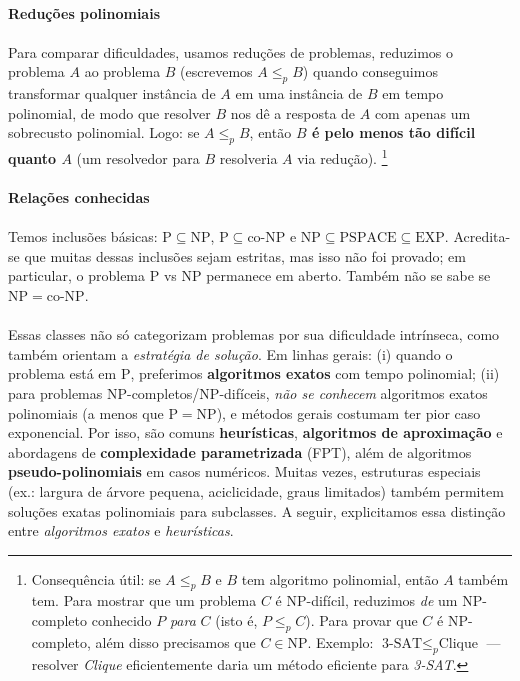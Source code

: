 \documentclass[12pt,a4paper]{article}
\begin{document}
\paragraph{Reduções polinomiais}

\paragraph{}
Para comparar dificuldades, usamos reduções de problemas, reduzimos o problema \(A\) ao problema \(B\) (escrevemos \(A\le_p B\)) quando conseguimos transformar qualquer instância de \(A\) em uma instância de \(B\) em tempo polinomial, de modo que resolver \(B\) nos dê a resposta de \(A\) com apenas um sobrecusto polinomial. Logo: se \(A\le_p B\), então \textbf{\(B\) é pelo menos tão difícil quanto \(A\)} (um resolvedor para \(B\) resolveria \(A\) via redução). \footnote{Consequência útil: se \(A\le_p B\) e \(B\) tem algoritmo polinomial, então \(A\) também tem. Para mostrar que um problema \(C\) é NP-difícil, reduzimos \emph{de} um NP-completo conhecido \(P\) \emph{para} \(C\) (isto é, \(P\le_p C\)). Para provar que \(C\) é NP-completo, além disso precisamos que \(C\in\mathrm{NP}\). Exemplo: \(\text{3-SAT}\le_p \text{Clique}\) — resolver \textit{Clique} eficientemente daria um método eficiente para \textit{3-SAT}.}

\paragraph{Relações conhecidas}

\paragraph{}
Temos inclusões básicas: \(\mathrm{P}\subseteq \mathrm{NP}\), \(\mathrm{P}\subseteq \mathrm{co\text{-}NP}\) e \(\mathrm{NP}\subseteq \mathrm{PSPACE}\subseteq \mathrm{EXP}\). Acredita-se que muitas dessas inclusões sejam estritas, mas isso não foi provado; em particular, o problema \(\mathrm{P}\) vs \(\mathrm{NP}\) permanece em aberto. Também não se sabe se \(\mathrm{NP}=\mathrm{co\text{-}NP}\).

\paragraph{}
Essas classes não só categorizam problemas por sua dificuldade intrínseca, como também orientam a \emph{estratégia de solução}. Em linhas gerais: (i) quando o problema está em \(\mathrm{P}\), preferimos \textbf{algoritmos exatos} com tempo polinomial; (ii) para problemas NP-completos/NP-difíceis, \emph{não se conhecem} algoritmos exatos polinomiais (a menos que \(\mathrm{P}=\mathrm{NP}\)), e métodos gerais costumam ter pior caso exponencial. Por isso, são comuns \textbf{heurísticas}, \textbf{algoritmos de aproximação} e abordagens de \textbf{complexidade parametrizada} (FPT), além de algoritmos \textbf{pseudo-polinomiais} em casos numéricos. Muitas vezes, estruturas especiais (ex.: largura de árvore pequena, aciclicidade, graus limitados) também permitem soluções exatas polinomiais para subclasses. A seguir, explicitamos essa distinção entre \emph{algoritmos exatos} e \emph{heurísticas}.
\end{document}
